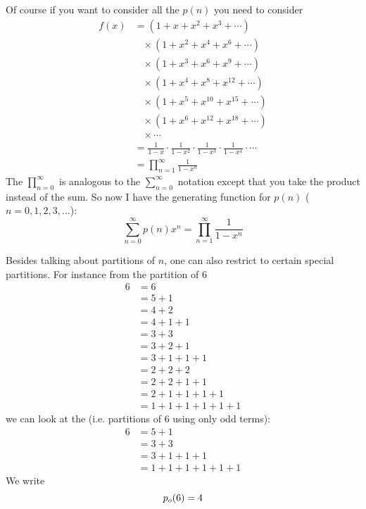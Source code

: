 Of course if you want to consider all the $p(n)$ you need to consider
\begin{align*}
f(x) 
&= (1 + x + x^2 + x^3 + \cdots ) \\
& \,\,\,\,\, \times (1 + x^2 + x^4 + x^6 + \cdots ) \\
& \,\,\,\,\, \times (1 + x^3 + x^6 + x^9 + \cdots ) \\
& \,\,\,\,\, \times (1 + x^4 + x^8 + x^{12} + \cdots ) \\
& \,\,\,\,\, \times (1 + x^5 + x^{10} + x^{15} + \cdots ) \\
& \,\,\,\,\, \times (1 + x^6 + x^{12} + x^{18} + \cdots ) \\
& \,\,\,\,\, \times \cdots \\
&= \frac{1}{1 - x} \cdot \frac{1}{1 - x^2} \cdot \frac{1}{1 - x^3} \cdot \frac{1}{1 - x^4} \cdot \cdots \\
&= \prod_{n=1}^\infty \frac{1}{1 - x^n}
\end{align*}
The $\prod_{n=0}^\infty$ is analogous to the $\sum_{n=0}^\infty$ notation
except that you take the product instead of the sum.
So now I have the generating function for $p(n)$ ($n=0, 1, 2, 3, \ldots$):
\[
\sum_{n=0}^\infty p(n) x^n =  \prod_{n=1}^\infty \frac{1}{1 - x^n}
\]

Besides talking about partitions of $n$,
one can also restrict to certain special partitions.
For instance from the partition of 6
\begin{align*}
6
&= 6 \\
&= 5 + 1\\
&= 4 + 2 \\
&= 4 + 1 + 1 \\
&= 3 + 3 \\
&= 3 + 2 + 1 \\
&= 3 + 1 + 1 + 1 \\
&= 2 + 2 + 2 \\
&= 2 + 2 + 1 + 1 \\
&= 2 + 1 + 1 + 1 + 1 \\
&= 1 + 1 + 1 + 1 + 1 + 1 
\end{align*}
we can look at the  (i.e. partitions of $6$ using only odd terms):
\begin{align*}
6
&= 5 + 1\\
&= 3 + 3 \\
&= 3 + 1 + 1 + 1 \\
&= 1 + 1 + 1 + 1 + 1 + 1 
\end{align*}
We write
\[
p_o(6) = 4\index{p0@$p_0(n)$}
\]


